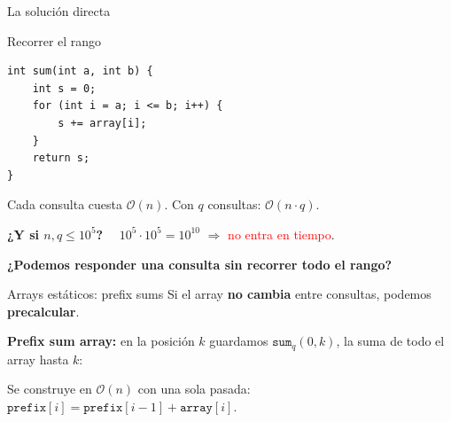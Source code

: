 \documentclass{beamer}
\begin{document}
\begin{frame}[fragile]{La solución directa}
    \begin{block}{Recorrer el rango}
    \begin{verbatim}
int sum(int a, int b) {
    int s = 0;
    for (int i = a; i <= b; i++) {
        s += array[i];
    }
    return s;
}
    \end{verbatim}
    \end{block}

    \vspace{0.2cm}
    Cada consulta cuesta $\mathcal{O}(n)$. Con $q$ consultas: $\mathcal{O}(n \cdot q)$.

    \vspace{0.2cm}
    \textbf{¿Y si $n, q \leq 10^5$?} $\quad 10^5 \cdot 10^5 = 10^{10}$
    $\Rightarrow$ \textcolor{red}{no entra en tiempo}.

    \vspace{0.2cm}
    \textbf{¿Podemos responder una consulta sin recorrer todo el rango?}
\end{frame}


\begin{frame}{Arrays estáticos: prefix sums}
    Si el array \textbf{no cambia} entre consultas, podemos \textbf{precalcular}.

    \vspace{0.2cm}
    \textbf{Prefix sum array:} en la posición $k$ guardamos
    $\texttt{sum}_q(0,k)$, la suma de todo el array hasta $k$:
    \begin{center}
    \end{center}

    \vspace{0.2cm}
    Se construye en $\mathcal{O}(n)$ con una sola pasada:
    $\texttt{prefix}[i] = \texttt{prefix}[i-1] + \texttt{array}[i]$.
\end{frame}
\end{document}
